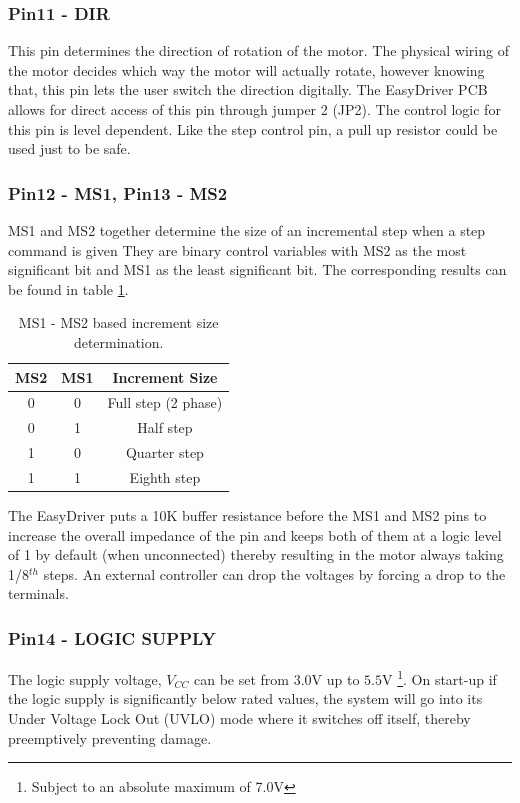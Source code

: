 \documentclass{article}
\theoremstyle{plain}
\theoremstyle{definition}
\theoremstyle{remark}
\begin{document}
\subsubsection*{Pin11 - DIR}
This pin determines the direction of rotation of the motor. The physical wiring of the motor decides which way the motor will actually rotate, however knowing that, this pin lets the user switch the direction digitally. The EasyDriver PCB allows for direct access of this pin through jumper 2 (JP2). The control logic for this pin is level dependent. Like the step control pin, a  pull up resistor could be used just to be safe.\\

\subsubsection*{Pin12 - MS1, Pin13 - MS2}
MS1 and MS2 together determine the size of an incremental step when a step command is given They are binary control variables with MS2 as the most significant bit and MS1 as the least significant bit. The corresponding results can be found in table \ref{q1_b3}.\\

\begin{table}[htb]
\begin{center}
    \begin{tabular}{|c|c|c|}
        \hline
        MS2 & MS1  & Increment Size          \\ \hline
        0   & 0    & Full step (2 phase) \\ 
        0   & 1    & Half step           \\ 
        1   & 0    & Quarter step        \\ 
        1   & 1    & Eighth step         \\
        \hline
    \end{tabular}
\caption{MS1 - MS2 based increment size determination.}
\label{q1_b3}
\end{center}
\end{table}

The EasyDriver puts a 10K buffer resistance before the MS1 and MS2 pins to increase the overall impedance of the pin and keeps both of them at a logic level of 1 by default (when unconnected) thereby resulting in the motor always taking 1/8$^{th}$ steps. An external controller can drop the voltages by forcing a drop to the terminals.

\subsubsection*{Pin14 - LOGIC SUPPLY}
The logic supply voltage, $V_{CC}$  can be set from $3.0$V up to $5.5$V \footnote{Subject to an absolute maximum of 7.0V}. On start-up if the logic supply is significantly below rated values, the system will go into its Under Voltage Lock Out (UVLO) mode where it switches off itself, thereby preemptively preventing damage.\\
\end{document}
